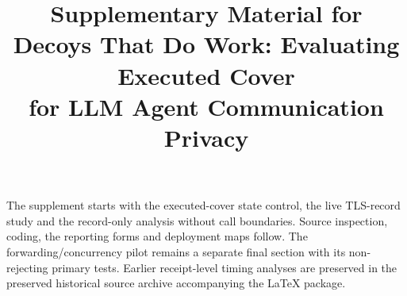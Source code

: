 \documentclass[conference,compsoc]{IEEEtran}
\title{Supplementary Material for\\Decoys That Do Work: Evaluating Executed Cover\\for LLM Agent Communication Privacy}
\author{}
\begin{document}

\raggedbottom
\pagestyle{plain}
\maketitle
\thispagestyle{plain}
\noindent The supplement starts with the executed-cover state control, the live TLS-record study and the record-only analysis without call boundaries. Source inspection, coding, the reporting forms and deployment maps follow. The forwarding/concurrency pilot remains a separate final section with its non-rejecting primary tests. Earlier receipt-level timing analyses are preserved in the preserved historical source archive accompanying the LaTeX package.

\clearpage
\clearpage
\clearpage\onecolumn\twocolumn






\clearpage
\clearpage
\clearpage\onecolumn\twocolumn


\end{document}
